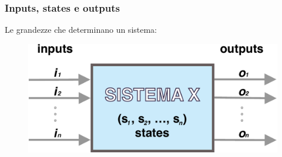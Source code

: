 \begin{frame}
	\frametitle{Inputs, states e outputs}
	
	\begin{block}{Le grandezze che determinano un sistema:}
		\vspace{1.5em}
		\begin{figure}[!htbp]
			\centering
			\includegraphics[width=0.65\linewidth]{images/1_i_sistemi/sistemaX2.pdf}
		\end{figure}
		\vspace{1.5em}
	\end{block}
\end{frame}



